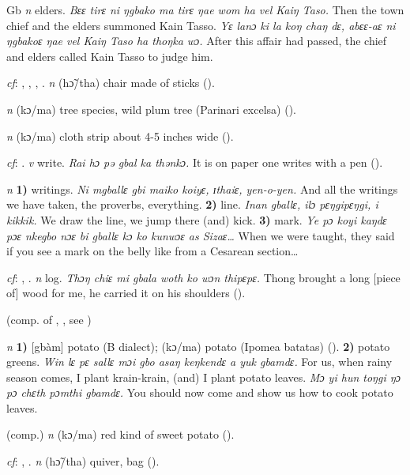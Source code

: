 \begin{letter}{Gb}
 \textit{n} elders. \textit{Bɛɛ tirɛ ni ŋgbako ma tirɛ ŋae wom ha vel Kaiŋ Taso.} Then the town chief and the elders summoned Kain Tasso. \textit{Yɛ lanɔ ki la koŋ chaŋ dɛ, abɛɛ-aɛ ni ŋgbakoɛ ŋae vel Kaiŋ Taso ha thoŋka wɔ.} After this affair had passed, the chief and elders called Kain Tasso to judge him. 

 \textit{cf}: , , , . \textit{n} (hɔ̃/tha) chair made of sticks (\citealt{Pichl1967}).

 \textit{n} (kɔ/ma) tree species, wild plum tree (Parinari excelsa) (\citealt{Pichl1967}). 

 \textit{n} (kɔ/ma) cloth strip about 4-5 inches wide (\citealt{Pichl1967}). 

 \textit{cf}: . \textit{v} write. \textit{Rai hɔ pə gbal ka thənkɔ.} It is on paper one writes with a pen (\citealt{Pichl1967}). 

 \textit{n} \textbf{1)} writings. \textit{Ni mgballɛ gbi maiko koiyɛ, ɪthaiɛ, yen-o-yen.} And all the writings we have taken, the proverbs, everything. \textbf{2)} line. \textit{Inan gballɛ, ilɔ pɛŋgipɛŋgi, i kikkik.} We draw the line, we jump there (and) kick. \textbf{3)} mark. \textit{Ye pɔ koyi kaŋdɛ pɔɛ nkegbo nɔɛ bi gballɛ kɔ ko kunwɔɛ as Sizaɛ…} When we were taught, they said if you see a mark on the belly like from a Cesarean section…

 \textit{cf}: , . \textit{n} log. \textit{Thɔŋ chiɛ mi gbala woth ko wɔn thipɛpɛ.} Thong brought a long [piece of] wood for me, he carried it on his shoulders (\citealt{Pichl1967}). 

 (comp. of , , see ) 

 \textit{n} \textbf{1)} [gbàm] potato (B dialect); (kɔ/ma) potato (Ipomea batatas) (\citealt{Pichl1967}). \textbf{2)} potato greens. \textit{Win lɛ pɛ sallɛ mɔi gbo asaŋ keŋkendɛ a yuk gbamdɛ.} For us, when rainy season comes, I plant krain-krain, (and) I plant potato leaves. \textit{Mɔ yi hun toŋgi ŋɔ pɔ chɛth pɔmthi gbamdɛ.} You should now come and show us how to cook potato leaves.

 (comp.) \textit{n} (kɔ/ma) red kind of sweet potato (\citealt{Pichl1967}).

 \textit{cf}: , . \textit{n} (hɔ̃/tha) quiver, bag (\citealt{Pichl1967}). 


\end{letter}
